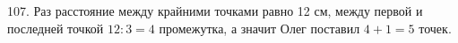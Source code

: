 107. Раз расстояние между крайними точками равно 12 см, между первой и последней точкой $12:3=4$ промежутка, а значит Олег поставил $4+1=5$ точек.\\

